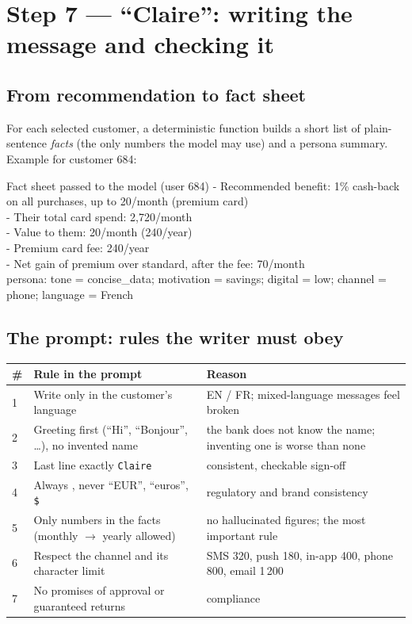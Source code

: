 \documentclass[11pt,a4paper]{article}
\newcommand{\eur}{\texttt{\texteuro}}
\begin{document}
\section{Step 7 --- ``Claire'': writing the message and checking it}

\subsection{From recommendation to fact sheet}

For each selected customer, a deterministic function builds a short list of plain-sentence \emph{facts} (the only numbers the model may use)
and a persona summary. Example for customer 684:

\begin{msg}[ca]{Fact sheet passed to the model (user 684)}
\upshape\ttfamily\footnotesize
- Recommended benefit: 1\% cash-back on all purchases, up to \eur20/month (premium card)\\
- Their total card spend: \eur2,720/month\\
- Value to them: \eur20/month (\eur240/year)\\
- Premium card fee: \eur240/year\\
- Net gain of premium over standard, after the fee: \eur70/month\\[3pt]
persona: tone = concise\_data; motivation = savings; digital = low; channel = phone; language = French
\end{msg}

\subsection{The prompt: rules the writer must obey}

\begin{center}
\small
\begin{tabularx}{\linewidth}{@{}p{0.6cm}p{5.4cm}X@{}}
\toprule
\textbf{\#} & \textbf{Rule in the prompt} & \textbf{Reason}\\
\midrule
1 & Write only in the customer's language & EN / FR; mixed-language messages feel broken\\
2 & Greeting first (``Hi'', ``Bonjour'', \dots), no invented name & the bank does not know the name; inventing one is worse than none\\
3 & Last line exactly \texttt{Claire} & consistent, checkable sign-off\\
4 & Always \texttt{\eur}, never ``EUR'', ``euros'', \texttt{\$} & regulatory and brand consistency\\
5 & Only numbers in the facts (monthly $\to$ yearly allowed) & no hallucinated figures; the most important rule\\
6 & Respect the channel and its character limit & SMS 320, push 180, in-app 400, phone 800, email 1\,200\\
7 & No promises of approval or guaranteed returns & compliance\\
\bottomrule
\end{tabularx}
\end{center}
\end{document}
